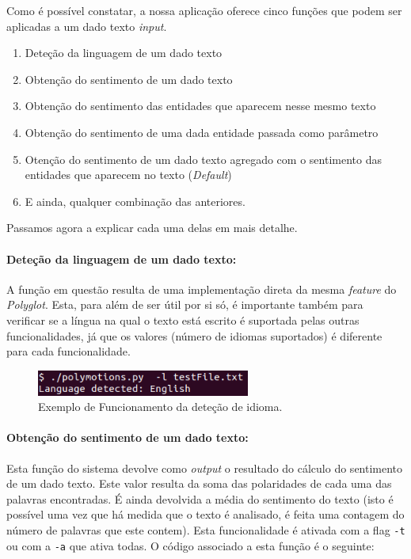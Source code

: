 \documentclass{article}
\begin{document}
Como é possível constatar, a nossa aplicação oferece cinco funções que podem ser aplicadas a um dado texto \textit{input}.
\begin{enumerate}
    \item Deteção da linguagem de um dado texto
    \item Obtenção do sentimento de um dado texto
    \item Obtenção do sentimento das entidades que aparecem nesse mesmo texto
    \item Obtenção do sentimento de uma dada entidade passada como parâmetro
    \item Otenção do sentimento de um dado texto agregado com o sentimento das entidades que aparecem no texto (\textit{Default})
    \item E ainda, qualquer combinação das anteriores.
\end{enumerate}

Passamos agora a explicar cada uma delas em mais detalhe.

\paragraph{Deteção da linguagem de um dado texto:} 
A função em questão resulta de uma implementação direta da mesma \textit{feature} do \textit{Polyglot}. Esta, para além de ser útil por si só, é importante também para verificar se a língua na qual o texto está escrito é suportada pelas outras funcionalidades, já que os valores (número de idiomas suportados) é diferente para cada funcionalidade.

\begin{figure}[H]
\begin{center}
    \includegraphics[width = 7cm, keepaspectratio]{Pictures/l.png}
    \caption{Exemplo de Funcionamento da deteção de idioma. }
    \label{fig:loption}
\end{center}
\end{figure}

\paragraph{Obtenção do sentimento de um dado texto:} Esta função do sistema devolve como \textit{output} o resultado do cálculo do sentimento de um dado texto. Este valor resulta da soma das polaridades de cada uma das palavras encontradas. É ainda devolvida a média do sentimento do texto (isto é possível uma vez que há medida que o texto é analisado, é feita uma contagem do número de palavras que este contem).
Esta funcionalidade é ativada  com a flag \verb|-t| ou com a \verb|-a| que ativa todas.
O código associado a esta função é o seguinte:
\end{document}
